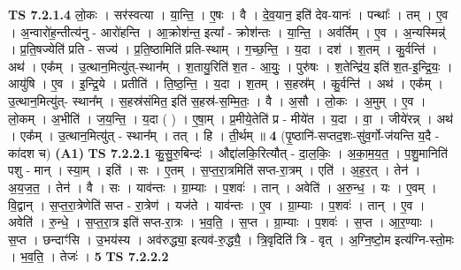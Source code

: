 \documentclass[17pt]{extarticle}
\begin{document}
                  \newline
                                \textbf{ TS 7.2.1.4} \newline
                  लो॒कः । सर॑स्वत्या । या॒न्ति॒ । ए॒षः । वै । दे॒व॒यान॒ इति॑ देव-यानः॑ । पन्थाः᳚ । तम् । ए॒व । अ॒न्वारो॑ह॒न्तीत्य॑नु - आरो॑हन्ति । आ॒क्रोश॑न्त॒ इत्या᳚ - क्रोश॑न्तः । या॒न्ति॒ । अव॑र्तिम् । ए॒व । अ॒न्यस्मिन्न्॑ । प्र॒ति॒षज्येति॑ प्रति - सज्य॑ । प्र॒ति॒ष्ठामिति॑ प्रति-स्थाम् । ग॒च्छ॒न्ति॒ । य॒दा । दश॑ । श॒तम् । कु॒र्वन्ति॑ । अथ॑ । एक᳚म् । उ॒त्थान॒मित्यु॑त्-स्थान᳚म् । श॒तायु॒रिति॑ श॒त - आ॒युः॒ । पुरु॑षः । श॒तेन्द्रि॑य॒ इति॑ श॒त-इ॒न्द्रि॒यः॒ । आयु॑षि । ए॒व । इ॒न्द्रि॒ये । प्रतीति॑ । ति॒ष्ठ॒न्ति॒ । य॒दा । श॒तम् । स॒हस्र᳚म् । कु॒र्वन्ति॑ । अथ॑ । एक᳚म् । उ॒त्थान॒मित्यु॑त्- स्थान᳚म् । स॒हस्र॑संमित॒ इति॑ स॒हस्र॑-स॒म्मि॒तः॒ । वै । अ॒सौ । लो॒कः । अ॒मुम् । ए॒व । लो॒कम् । अ॒भीति॑ । ज॒य॒न्ति॒ । य॒दा ( ) । ए॒षा॒म् । प्र॒मीये॒तेति॑ प्र - मीये॑त । य॒दा । वा॒ । जीये॑रन्न् । अथ॑ । एक᳚म् । उ॒त्थान॒मित्यु॑त् - स्थान᳚म् । तत् । हि । ती॒र्थम् ॥ \textbf{  4 } \newline
                  \newline
                      (पृ॒ष्ठानि॑-सप्तद॒शः-सु॑व॒र्गो-ज॑यन्ति य॒दै - का॑दश च)  \textbf{(A1)} \newline \newline
                                \textbf{ TS 7.2.2.1} \newline
                  कु॒सु॒रु॒बिन्दः॑ । औद्दा॑लकि॒रित्यौत् - दा॒ल॒किः॒ । अ॒का॒म॒य॒त॒ । प॒शु॒मानिति॑ पशु - मान् । स्या॒म् । इति॑ । सः । ए॒तम् । स॒प्त॒रा॒त्रमिति॑ सप्त-रा॒त्रम् । एति॑ । अ॒ह॒र॒त् । तेन॑ । अ॒य॒ज॒त॒ । तेन॑ । वै । सः । याव॑न्तः । ग्रा॒म्याः । प॒शवः॑ । तान् । अवेति॑ । अ॒रु॒न्ध॒ । यः । ए॒वम् । वि॒द्वान् । स॒प्त॒रा॒त्रेणेति॑ सप्त - रा॒त्रेण॑ । यज॑ते । याव॑न्तः । ए॒व । ग्रा॒म्याः । प॒शवः॑ । तान् । ए॒व । अवेति॑ । रु॒न्धे॒ । स॒प्त॒रा॒त्र इति॑ सप्त-रा॒त्रः । भ॒व॒ति॒ । स॒प्त । ग्रा॒म्याः । प॒शवः॑ । स॒प्त । आ॒र॒ण्याः । स॒प्त । छन्दाꣳ॑सि । उ॒भय॑स्य । अव॑रुद्ध्या॒ इत्यव॑-रु॒द्ध्यै॒ । त्रि॒वृदिति॑ त्रि - वृत् । अ॒ग्नि॒ष्टो॒म इत्य॑ग्नि-स्तो॒मः । भ॒व॒ति॒ । तेजः॑ । \textbf{  5} \newline
                  \newline
                                \textbf{ TS 7.2.2.2} \newline
\end{document}
